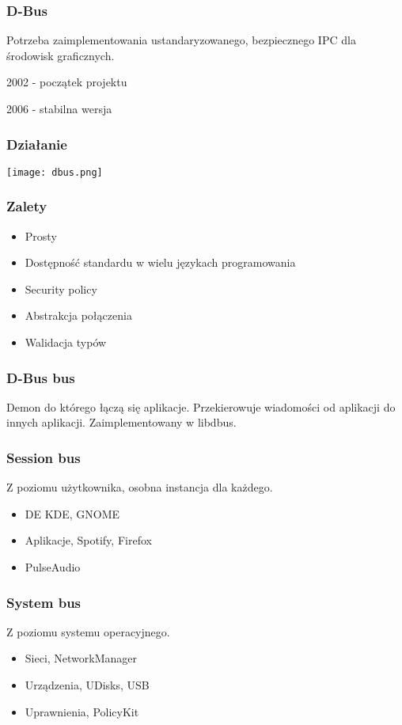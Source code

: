 \begin{frame}
    \frametitle{D-Bus}
    Potrzeba zaimplementowania ustandaryzowanego,
    bezpiecznego IPC dla
    środowisk graficznych.

    2002 - początek projektu

    2006 - stabilna wersja
\end{frame}

\begin{frame}
    \frametitle{Działanie}
    \texttt{[image: dbus.png]}
\end{frame}

\begin{frame}
    \frametitle{Zalety}
    \begin{itemize}
        \item Prosty 
        \item Dostępność standardu w wielu językach programowania 
        \item Security policy 
        \item Abstrakcja połączenia 
        \item Walidacja typów
    \end{itemize}
\end{frame}

\begin{frame}
    \frametitle{D-Bus bus}
    Demon do którego łączą się aplikacje. Przekierowuje
    wiadomości od aplikacji do innych aplikacji. Zaimplementowany
    w libdbus.
\end{frame}


\begin{frame}
    \frametitle{Session bus}
    Z poziomu użytkownika, osobna instancja dla każdego.
    \begin{itemize}
        \item DE KDE, GNOME 
        \item Aplikacje, Spotify, Firefox
        \item PulseAudio
    \end{itemize}
\end{frame}

\begin{frame}
    \frametitle{System bus}
    Z poziomu systemu operacyjnego.
    \begin{itemize}
        \item Sieci, NetworkManager
        \item Urządzenia, UDisks, USB
        \item Uprawnienia, PolicyKit
    \end{itemize}
\end{frame}

